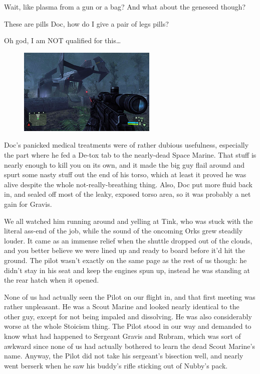 Wait, like plasma from a gun or a bag? 
And what about the geneseed though? 




These are pills Doc, how do I give a pair of legs pills?



Oh god, I am NOT qualified for this…



\begin{figure}
	\begin{center}
		\includegraphics[width=\figwidth]{pics/12/57.png}
	\end{center}
\end{figure}
Doc's panicked medical treatments were of rather dubious usefulness, especially the part where he fed a De-tox tab to the nearly-dead Space Marine. 
That stuff is nearly enough to kill you on its own, and it made the big guy flail around and spurt some nasty stuff out the end of his torso, which at least it proved he was alive despite the whole not-really-breathing thing. 
Also, Doc put more fluid back in, and sealed off most of the leaky, exposed torso area, so it was probably a net gain for Gravis.

We all watched him running around and yelling at Tink, who was stuck with the literal ass-end of the job, while the sound of the oncoming Orks grew steadily louder. 
It came as an immense relief when the shuttle dropped out of the clouds, and you better believe we were lined up and ready to board before it'd hit the ground. 
The pilot wasn't exactly on the same page as the rest of us though: 
he didn't stay in his seat and keep the engines spun up, instead he was standing at the rear hatch when it opened.

None of us had actually seen the Pilot on our flight in, and that first meeting was rather unpleasant. 
He was a Scout Marine and looked nearly identical to the other guy, except for not being impaled and dissolving. 
He was also considerably worse at the whole Stoicism thing. 
The Pilot stood in our way and demanded to know what had happened to Sergeant Gravis and Rubram, which was sort of awkward since none of us had actually bothered to learn the dead Scout Marine's name. 
Anyway, the Pilot did not take his sergeant's bisection well, and nearly went berserk when he saw his buddy's rifle sticking out of Nubby's pack.

